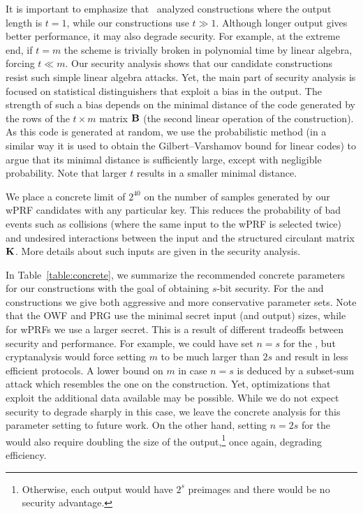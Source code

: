 It is important to emphasize that~\cite{cheon2020-adventures} analyzed constructions where the output length is $t=1$, while our constructions use $t \gg 1$. Although longer output gives better performance, it may also degrade security. For example, at the extreme end, if $t = m$ the scheme is trivially broken in polynomial time by linear algebra, forcing $t \ll m$. Our security analysis shows that our candidate constructions resist such simple linear algebra attacks. Yet, the main part of security analysis is focused on statistical distinguishers that exploit a bias in the output. The strength of such a bias depends on the minimal distance of the code generated by the rows of the $t \times m$ matrix $\mat{B}$ (the second linear operation of the construction). As this code is generated at random, we use the probabilistic method (in a similar way it is used to obtain the Gilbert–Varshamov bound for linear codes) to argue that its minimal distance is sufficiently large, except with negligible probability. Note that larger $t$ results in a smaller minimal distance.

We place a concrete limit of $2^{40}$ on the number of samples generated by our wPRF candidates with any particular key. This reduces the probability of bad events such as collisions (where the same input to the wPRF is selected twice) and undesired interactions between the input and the structured circulant matrix $\mat{K}$. More details about such inputs are given in the security analysis.

In Table~\ref{table:concrete}, we summarize the recommended concrete parameters for our constructions with the goal of obtaining $s$-bit security. For the \ttOWF and \ttwPRF constructions we give both aggressive and more conservative parameter sets. Note that the OWF and PRG use the minimal secret input (and output) sizes, while for wPRFs we use a larger secret. This is a result of different tradeoffs between security and performance. For example, we could have set $n = s$ for the \ttwPRF, but cryptanalysis would force setting $m$ to be much larger than $2s$ and result in less efficient protocols. A lower bound on $m$ in case $n=s$ is deduced by a subset-sum attack which resembles the one on the \ttOWF construction. Yet, optimizations that exploit the additional data available may be possible. While we do not expect security to degrade sharply in this case, we leave the concrete analysis for this parameter setting to future work. On the other hand, setting $n = 2s$ for the \ttOWF would also require doubling the size of the output,\footnote{Otherwise, each output would have $2^s$ preimages and there would be no security advantage.} once again, degrading efficiency.

